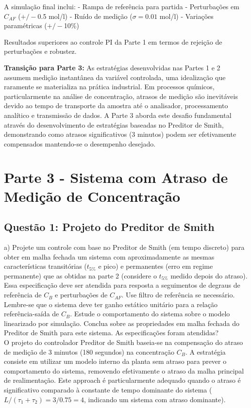 \documentclass[a4paper,12pt]{article}
\begin{document}
A simulação final inclui:
- Rampa de referência para partida
- Perturbações em $C_{AF}$ ($+/-$0.5 mol/l)
- Ruído de medição ($\sigma = 0.01$ mol/l)
- Variações paramétricas ($+/-$10\%)

Resultados superiores ao controle PI da Parte 1 em termos de rejeição de perturbações e robustez.

\textbf{Transição para Parte 3:} As estratégias desenvolvidas nas Partes 1 e 2 assumem medição instantânea da variável controlada, uma idealização que raramente se materializa na prática industrial. Em processos químicos, particularmente na análise de concentração, atrasos de medição são inevitáveis devido ao tempo de transporte da amostra até o analisador, processamento analítico e transmissão de dados. A Parte 3 aborda este desafio fundamental através do desenvolvimento de estratégias baseadas no Preditor de Smith, demonstrando como atrasos significativos (3 minutos) podem ser efetivamente compensados mantendo-se o desempenho desejado.

\newpage

\section{Parte 3 - Sistema com Atraso de Medição de Concentração}

\subsection{Questão 1: Projeto do Preditor de Smith}

a) Projete um controle com base no Preditor de Smith (em tempo discreto) para obter em malha fechada um sistema com aproximadamente as mesmas características transitórias ($t_{5\%}$ e pico) e permanentes (erro em regime permanente) que as obtidas na parte 2 (considere o $t_{5\%}$ medido depois do atraso). Essa especificação deve ser atendida para resposta a seguimentos de degraus de referência de $C_B$ e perturbações de $C_{AF}$. Use filtro de referência se necessário. Lembre-se que o sistema deve ter ganho estático unitário para a relação referência-saída de $C_B$. Estude o comportamento do sistema sobre o modelo linearizado por simulação. Conclua sobre as propriedades em malha fechada do Preditor de Smith para este sistema. As especificações foram atendidas?\\

O projeto do controlador Preditor de Smith baseia-se na compensação do atraso de medição de 3 minutos (180 segundos) na concentração $C_B$. A estratégia consiste em utilizar um modelo interno da planta sem atraso para prever o comportamento do sistema, removendo efetivamente o atraso da malha principal de realimentação. Este approach é particularmente adequado quando o atraso é significativo comparado à constante de tempo dominante do sistema ($L/(\tau_1 + \tau_2) = 3/0.75 = 4$, indicando um sistema com atraso dominante).
\end{document}
